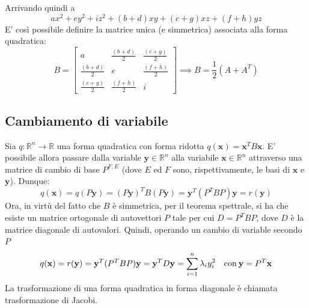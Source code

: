 \documentclass{article}
\begin{document}
    Arrivando quindi a
    \[
        ax^2 + ey^2 + iz^2 + (b + d)xy + (c + g)xz + (f + h)yz
    \]
    E' così possibile definire la matrice unica (e simmetrica) associata alla forma quadratica:
    \[
        B = \begin{bmatrix}
            a & \frac{(b+d)}{2} & \frac{(c+g)}{2} \\
            \frac{(b+d)}{2} & e & \frac{(f+h)}{2} \\
            \frac{(c+g)}{2} & \frac{(f+h)}{2} & i
        \end{bmatrix} 
        \implies 
        B = \frac{1}{2} (A + A^T)
    \]



\vspace{10pt}
\subsection{Cambiamento di variabile} \label{subsec:quadformchange}
    Sia $q: \mathbb{R}^{n} \rightarrow \mathbb{R}$ una forma quadratica con forma ridotta $q(\mathbf{x}) = \mathbf{x}^{T} B \mathbf{x}$. E' possibile allora passare dalla variable $\mathbf{y} \in \mathbb{R}^{n}$ alla variabile $\mathbf{x} \in \mathbb{R}^{n}$ 
    attraverso una matrice di cambio di base $P^{F, E}$ (dove $E$ ed $F$ sono, rispettivamente, le basi di $\mathbf{x}$ e $\mathbf{y}$). Dunque:
    \[
        q(\mathbf{x}) = q(P \mathbf{y}) = (P \mathbf{y})^{T} B (P \mathbf{y}) = \mathbf{y}^T (P^T B P) \mathbf{y} = r(\mathbf{y})
    \]
    Ora, in virtù del fatto che $B$ è simmetrica, per il teorema spettrale, si ha che esiste un matrice ortogonale di autovettori $P$ tale per cui $D = P^{T} B P$, dove $D$ è la matrice diagonale di autovalori. Quindi, operando un cambio di variable secondo $P$
    \[
        q(\mathbf{x}) = r(\mathbf{y}) = \mathbf{y}^{T} (P^T B P) \mathbf{y} = \mathbf{y}^{T} D \mathbf{y} = \sum_{i = 1}^{n} \lambda_i y_i^2  \quad \textnormal{con} \: \mathbf{y} = P^{T} \mathbf{x}
    \]
    La trasformazione di una forma quadratica in forma diagonale è chiamata trasformazione di Jacobi.



\vspace{10pt}
\end{document}
